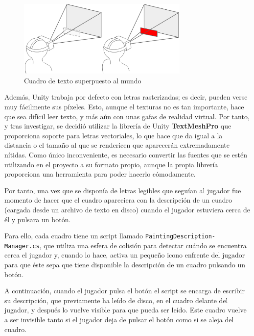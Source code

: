 \begin{figure}[!h]
\begin{center}
\includegraphics[width=0.75\textwidth]{imagenes/7/camera-overlay.png}
\caption{Cuadro de texto superpuesto al mundo}
\label{fig:camera-overlay}
\end{center}
\end{figure}

Además, Unity trabaja por defecto con letras rasterizadas; es decir, pueden verse muy fácilmente sus píxeles. Esto, aunque el texturas no es tan importante, hace que sea difícil leer texto, y más aún con unas gafas de realidad virtual. Por tanto, y tras investigar, se decidió utilizar la librería de Unity \textbf{TextMeshPro} que proporciona soporte para letras vectoriales, lo que hace que da igual a la distancia o el tamaño al que se rendericen que aparecerán extremadamente nítidas. Como único inconveniente, es necesario convertir las fuentes que se estén utilizando en el proyecto a su formato propio, aunque la propia librería proporciona una herramienta para poder hacerlo cómodamente.

Por tanto, una vez que se disponía de letras legibles que seguían al jugador fue momento de hacer que el cuadro apareciera con la descripción de un cuadro (cargada desde un archivo de texto en disco) cuando el jugador estuviera cerca de él y pulsara un botón.

Para ello, cada cuadro tiene un script llamado \texttt{PaintingDescription-} \texttt{Manager.cs}, que utiliza una esfera de colisión para detectar cuándo se encuentra cerca el jugador y, cuando lo hace, activa un pequeño icono enfrente del jugador para que éste sepa que tiene disponible la descripción de un cuadro pulsando un botón.

A continuación, cuando el jugador pulsa el botón el script se encarga de escribir su descripción, que previamente ha leído de disco, en el cuadro delante del jugador, y después lo vuelve visible para que pueda ser leído. Este cuadro vuelve a ser invisible tanto si el jugador deja de pulsar el botón como si se aleja del cuadro.

